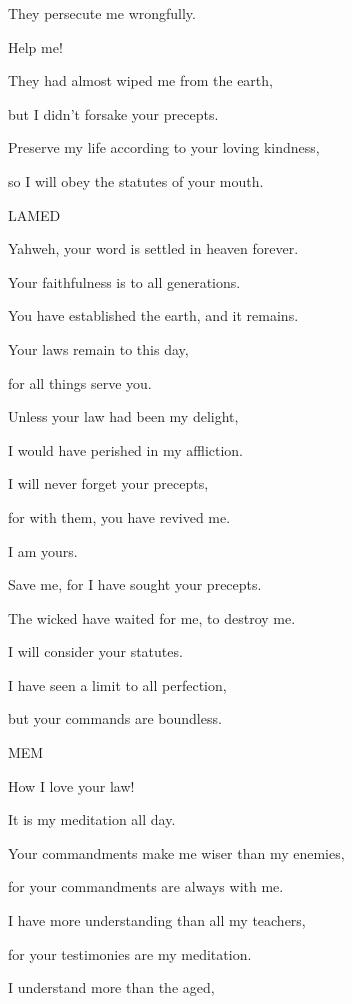 {\par }{\QB They persecute me wrongfully.
\par }{\QB Help me!
\par }{\Q {}They had almost wiped me from the earth,
\par }{\QB but I didn’t forsake your precepts.
\par }{\Q {}Preserve my life according to your loving kindness,
\par }{\QB so I will obey the statutes of your mouth.
\par }{\D LAMED
\par }{\Q {}Yahweh, your word is settled in heaven forever.
\par }{\Q {}Your faithfulness is to all generations.
\par }{\QB You have established the earth, and it remains.
\par }{\Q {}Your laws remain to this day,
\par }{\QB for all things serve you.
\par }{\Q {}Unless your law had been my delight,
\par }{\QB I would have perished in my affliction.
\par }{\Q {}I will never forget your precepts,
\par }{\QB for with them, you have revived me.
\par }{\Q {}I am yours.
\par }{\QB Save me, for I have sought your precepts.
\par }{\Q {}The wicked have waited for me, to destroy me.
\par }{\QB I will consider your statutes.
\par }{\Q {}I have seen a limit to all perfection,
\par }{\QB but your commands are boundless.
\par }{\D MEM
\par }{\Q {}How I love your law!
\par }{\QB It is my meditation all day.
\par }{\Q {}Your commandments make me wiser than my enemies,
\par }{\QB for your commandments are always with me.
\par }{\Q {}I have more understanding than all my teachers,
\par }{\QB for your testimonies are my meditation.
\par }{\Q {}I understand more than the aged,
}
